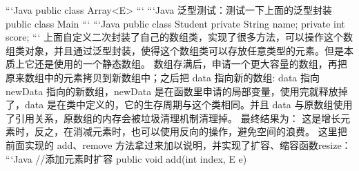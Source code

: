 {}\markdownRendererInterblockSeparator
{}```Java public class Array<E>\markdownRendererLeftBrace{}\markdownRendererInterblockSeparator
{}\markdownRendererInterblockSeparator
{}\markdownRendererRightBrace{} ```\markdownRendererInterblockSeparator
{}```Java 泛型测试：测试一下上面的泛型封装 public class Main\markdownRendererLeftBrace{}\markdownRendererInterblockSeparator
{}\markdownRendererInterblockSeparator
{}\markdownRendererRightBrace{}\markdownRendererInterblockSeparator
{}```\markdownRendererInterblockSeparator
{}```Java public class Student\markdownRendererLeftBrace{} private String name; private int score;\markdownRendererInterblockSeparator
{}\markdownRendererInterblockSeparator
{}\markdownRendererRightBrace{} ```\markdownRendererInterblockSeparator
{}\markdownRendererInterblockSeparator
{}上面自定义二次封装了自己的数组类，实现了很多方法，可以操作这个数组类对象，并且通过泛型封装，使得这个数组类可以存放任意类型的元素。但是本质上它还是使用的一个静态数组。\markdownRendererInterblockSeparator
{} 数组存满后，申请一个更大容量的数组，再把原来数组中的元素拷贝到新数组中；之后把 data 指向新的数组:  data 指向 newData 指向的新数组，newData 是在函数里申请的局部变量，使用完就释放掉了，data 是在类中定义的，它的生存周期与这个类相同。并且 data 与原数组使用了引用关系，原数组的内存会被垃圾清理机制清理掉。 最终结果为：  这是增长元素时，反之，在消减元素时，也可以使用反向的操作，避免空间的浪费。\markdownRendererInterblockSeparator
{}这里把前面实现的 add、remove 方法拿过来加以说明，并实现了扩容、缩容函数resize： ```Java //添加元素时扩容 public void add(int index, E e)\markdownRendererLeftBrace{}\markdownRendererInterblockSeparator
{}\markdownRendererInterblockSeparator
{}\markdownRendererRightBrace{} \markdownRendererInterblockSeparator
